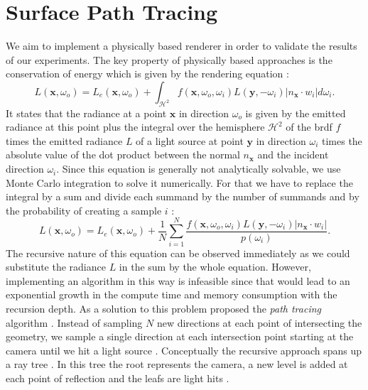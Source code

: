 \section{Surface Path Tracing}
We aim to implement a physically based renderer in order to validate the results of our experiments.
The key property of physically based approaches is the conservation of energy which is given by the rendering equation \cite{rendering_equation}:
\begin{equation}
    \label{eq:render_equation}
    L(\boldsymbol{x}, \omega_o) = L_e(\boldsymbol{x}, \omega_o) + \int_{\mathcal{H}^2} f(\boldsymbol{x}, \omega_o, \omega_i) L(\boldsymbol{y}, -\omega_i) |n_{\boldsymbol{x}} \cdot w_i| d\omega_i.
\end{equation}
It states that the radiance at a point $\boldsymbol{x}$ in direction $\omega_o$ is given by the emitted radiance at this point plus the integral over the hemisphere $\mathcal{H}^2$ of the \ac{brdf} $f$ times the emitted radiance $L$ of a light source at point $\boldsymbol{y}$ in direction $\omega_i$ times the absolute value of the dot product between the normal $n_{\boldsymbol{x}}$ and the incident direction $\omega_i$.
Since this equation is generally not analytically solvable, we use Monte Carlo integration to solve it numerically.
For that we have to replace the integral by a sum and divide each summand by the number of summands and by the probability of creating a sample $i$ \cite{pbr}:
\begin{equation*}
    L(\boldsymbol{x}, \omega_o) = L_e(\boldsymbol{x}, \omega_o) + \frac{1}{N}\sum_{i=1}^{N} \frac{f(\boldsymbol{x}, \omega_o, \omega_i) L(\boldsymbol{y}, -\omega_i) |n_{\boldsymbol{x}} \cdot w_i|}{p(\omega_i)}.
\end{equation*}
The recursive nature of this equation can be observed immediately as we could substitute the radiance $L$ in the sum by the whole equation.
However, implementing an algorithm in this way is infeasible since that would lead to an exponential growth in the compute time and memory consumption with the recursion depth.
As a solution to this problem \citeauthor{rendering_equation} proposed the \textit{path tracing} algorithm \cite{rendering_equation}.
Instead of sampling $N$ new directions at each point of intersecting the geometry, we sample a single direction at each intersection point starting at the camera until we hit a light source \cite{rendering_equation}.
Conceptually the recursive approach spans up a ray tree \cite{rendering_equation}.
In this tree the root represents the camera, a new level is added at each point of reflection and the leafs are light hits \cite{rendering_equation}.
